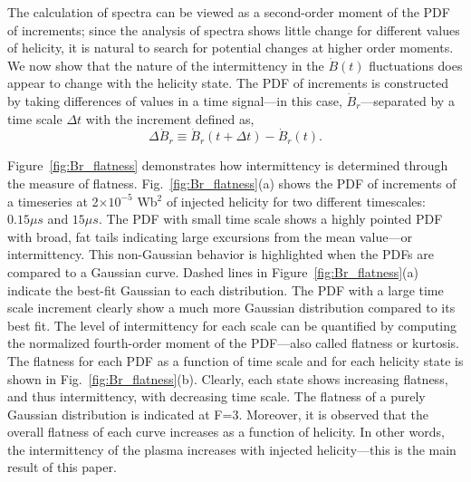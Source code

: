 \documentclass[aps,prl,amsmath,amssymb,reprint,superscriptaddress]{revtex4-1} %
\begin{document}
The calculation of spectra can be viewed as a second-order moment of the PDF of increments; since the analysis of spectra shows little change for different values of helicity, it is natural to search for potential changes at higher order moments. We now show that the nature of the intermittency in the $\dot{B}(t)$ fluctuations does appear to change with the helicity state. The PDF of increments is constructed by taking differences of values in a time signal---in this case, $\dot{B}_{r}$---separated by a time scale $\Delta t$ with the increment defined as,
\begin{equation}
\Delta \dot{B}_r \equiv \dot{B}_r(t + \Delta t)- \dot{B}_r(t).
\label{eq:increment}
\end{equation}

Figure~\ref{fig:Br_flatness} demonstrates how intermittency is determined through the measure of flatness.  Fig.~\ref{fig:Br_flatness}(a) shows the PDF of increments of a timeseries at 2$\times 10^{-5}$ Wb$^{2}$ of injected helicity for two different timescales: $0.15\mu s$ and $15\mu s$.  The PDF with small time scale shows a highly pointed PDF with broad, fat tails indicating large excursions from the mean value---or intermittency. This non-Gaussian behavior is highlighted when the PDFs are compared to a Gaussian curve. Dashed lines in Figure~\ref{fig:Br_flatness}(a) indicate the best-fit Gaussian to each distribution. The PDF with a large time scale increment clearly show a much more Gaussian distribution compared to its best fit. The level of intermittency for each scale can be quantified by computing the normalized fourth-order moment of the PDF---also called flatness or kurtosis. The flatness for each PDF as a function of time scale and for each helicity state is shown in Fig.~\ref{fig:Br_flatness}(b). Clearly, each state shows increasing flatness, and thus intermittency, with decreasing time scale. The flatness of a purely Gaussian distribution is indicated at F=3. Moreover, it is observed that the overall flatness of each curve increases as a function of helicity. In other words, the intermittency of the plasma increases with injected helicity---this is the main result of this paper.
\end{document}
